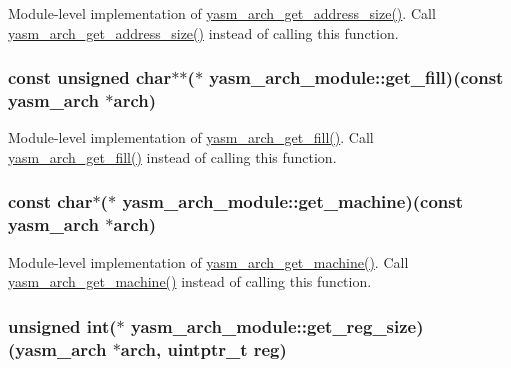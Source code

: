 Module-\/level implementation of \hyperlink{arch_8h_a544b276b9840e0bc39d0e6bdd27003c3}{yasm\-\_\-arch\-\_\-get\-\_\-address\-\_\-size()}. Call \hyperlink{arch_8h_a544b276b9840e0bc39d0e6bdd27003c3}{yasm\-\_\-arch\-\_\-get\-\_\-address\-\_\-size()} instead of calling this function. \hypertarget{structyasm__arch__module_abb1c7db4c07489d563408f13526e7ef0}{
\subsubsection[{get\-\_\-fill}]{\setlength{\rightskip}{0pt plus 5cm}const unsigned char$\ast$$\ast$($\ast$ yasm\-\_\-arch\-\_\-module\-::get\-\_\-fill)(const {\bf yasm\-\_\-arch} $\ast$arch)}}\label{structyasm__arch__module_abb1c7db4c07489d563408f13526e7ef0}
Module-\/level implementation of \hyperlink{arch_8h_a858df4dae177c2f755ebea857133c98f}{yasm\-\_\-arch\-\_\-get\-\_\-fill()}. Call \hyperlink{arch_8h_a858df4dae177c2f755ebea857133c98f}{yasm\-\_\-arch\-\_\-get\-\_\-fill()} instead of calling this function. \hypertarget{structyasm__arch__module_ad28eebf86539d87b4efabc55dbd47713}{
\subsubsection[{get\-\_\-machine}]{\setlength{\rightskip}{0pt plus 5cm}const char$\ast$($\ast$ yasm\-\_\-arch\-\_\-module\-::get\-\_\-machine)(const {\bf yasm\-\_\-arch} $\ast$arch)}}\label{structyasm__arch__module_ad28eebf86539d87b4efabc55dbd47713}
Module-\/level implementation of \hyperlink{arch_8h_a140c8c687d8dfcde94aafc3338ec3bee}{yasm\-\_\-arch\-\_\-get\-\_\-machine()}. Call \hyperlink{arch_8h_a140c8c687d8dfcde94aafc3338ec3bee}{yasm\-\_\-arch\-\_\-get\-\_\-machine()} instead of calling this function. \hypertarget{structyasm__arch__module_ab2fe2c571343ff116fad50c18f320ebd}{
\subsubsection[{get\-\_\-reg\-\_\-size}]{\setlength{\rightskip}{0pt plus 5cm}unsigned int($\ast$ yasm\-\_\-arch\-\_\-module\-::get\-\_\-reg\-\_\-size)({\bf yasm\-\_\-arch} $\ast$arch, uintptr\-\_\-t reg)}}\label{structyasm__arch__module_ab2fe2c571343ff116fad50c18f320ebd}
